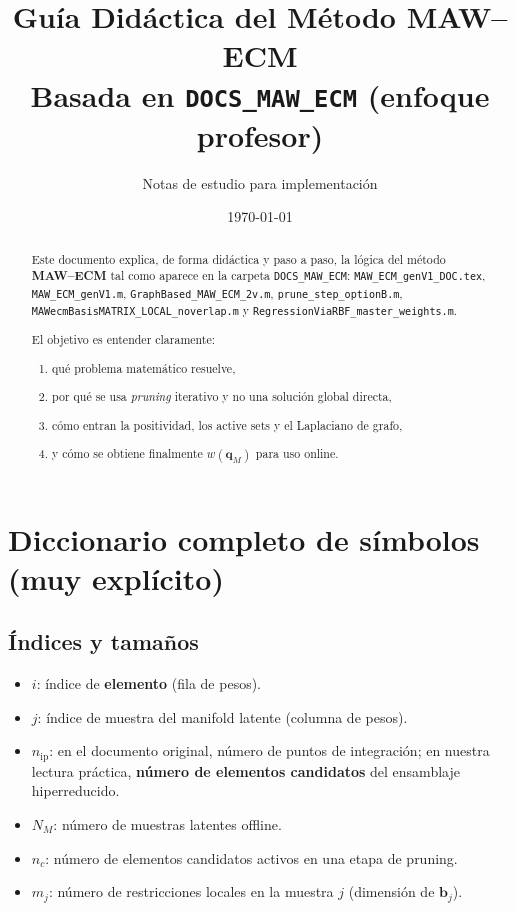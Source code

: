 \documentclass[11pt,a4paper]{article}
\title{Gu\'ia Did\'actica del M\'etodo MAW--ECM\\
\large Basada en \texttt{DOCS\_MAW\_ECM} (enfoque profesor)}
\author{Notas de estudio para implementaci\'on}
\date{\today}
\begin{document}
\maketitle

\begin{abstract}
Este documento explica, de forma did\'actica y paso a paso, la l\'ogica del m\'etodo
\textbf{MAW--ECM} tal como aparece en la carpeta \texttt{DOCS\_MAW\_ECM}:
\texttt{MAW\_ECM\_genV1\_DOC.tex}, \texttt{MAW\_ECM\_genV1.m},
\texttt{GraphBased\_MAW\_ECM\_2v.m}, \texttt{prune\_step\_optionB.m},
\texttt{MAWecmBasisMATRIX\_LOCAL\_noverlap.m} y
\texttt{RegressionViaRBF\_master\_weights.m}.

El objetivo es entender claramente:
\begin{enumerate}[leftmargin=1.2cm]
    \item qu\'e problema matem\'atico resuelve,
    \item por qu\'e se usa \emph{pruning} iterativo y no una soluci\'on global directa,
    \item c\'omo entran la positividad, los active sets y el Laplaciano de grafo,
    \item y c\'omo se obtiene finalmente $w(\bm q_M)$ para uso online.
\end{enumerate}
\end{abstract}

\tableofcontents

\section{Diccionario completo de s\'imbolos (muy expl\'icito)}
\subsection{\'Indices y tama\~nos}
\begin{itemize}[leftmargin=0.8cm]
    \item $i$: \'indice de \textbf{elemento} (fila de pesos).
    \item $j$: \'indice de muestra del manifold latente (columna de pesos).
    \item $n_{\text{ip}}$: en el documento original, n\'umero de puntos de integraci\'on; en nuestra lectura pr\'actica, \textbf{n\'umero de elementos candidatos} del ensamblaje hiperreducido.
    \item $N_M$: n\'umero de muestras latentes offline.
    \item $n_c$: n\'umero de elementos candidatos activos en una etapa de pruning.
    \item $m_j$: n\'umero de restricciones locales en la muestra $j$ (dimensi\'on de $\bm b_j$).
\end{itemize}
\end{document}
